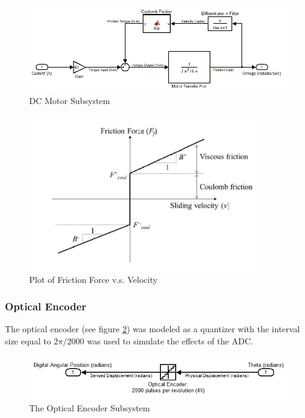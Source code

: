 \documentclass{article}
\theoremstyle{plain}
\theoremstyle{definition}
\theoremstyle{remark}
\begin{document}
\begin{figure}[htb]
\begin{center}
\includegraphics[width = 14cm]{q3_2}
\caption{DC Motor Subsystem}
\label{q3_2}
\end{center}
\end{figure}

\begin{figure}[htb]
\begin{center}
\includegraphics[width = 10cm]{q3_3}
\caption{Plot of Friction Force v.s. Velocity}
\label{q3_3}
\end{center}
\end{figure}

\clearpage

\subsubsection*{Optical Encoder}
The optical encoder (see figure \ref{q3_3}) was modeled as a quantizer with the interval size equal to $2\pi/2000$ was used to simulate the effects of the ADC.

\begin{figure}[htb]
\begin{center}
\includegraphics[width = 14cm]{q3_4}
\caption{The Optical Encoder Subsystem}
\label{q3_4}
\end{center}
\end{figure}
\end{document}
